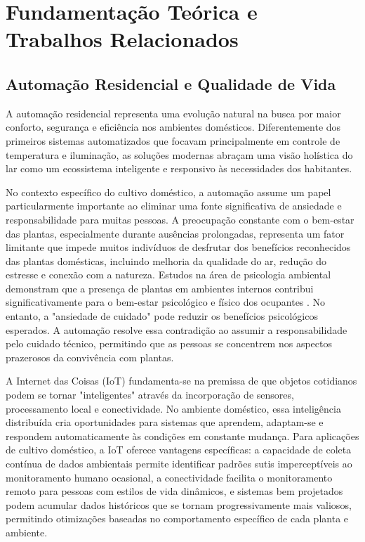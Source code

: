 \documentclass[oneside,english,brazilian]{UNISINOSmonografia}
\begin{document}
\chapter{Fundamentação Teórica e Trabalhos Relacionados}

\section{Automação Residencial e Qualidade de Vida}

A automação residencial representa uma evolução natural na busca por maior conforto, segurança e eficiência nos ambientes domésticos. Diferentemente dos primeiros sistemas automatizados que focavam principalmente em controle de temperatura e iluminação, as soluções modernas abraçam uma visão holística do lar como um ecossistema inteligente e responsivo às necessidades dos habitantes.

No contexto específico do cultivo doméstico, a automação assume um papel particularmente importante ao eliminar uma fonte significativa de ansiedade e responsabilidade para muitas pessoas. A preocupação constante com o bem-estar das plantas, especialmente durante ausências prolongadas, representa um fator limitante que impede muitos indivíduos de desfrutar dos benefícios reconhecidos das plantas domésticas, incluindo melhoria da qualidade do ar, redução do estresse e conexão com a natureza. Estudos na área de psicologia ambiental demonstram que a presença de plantas em ambientes internos contribui significativamente para o bem-estar psicológico e físico dos ocupantes \cite{fbi2025_smart_home_sa}. No entanto, a "ansiedade de cuidado" pode reduzir os benefícios psicológicos esperados. A automação resolve essa contradição ao assumir a responsabilidade pelo cuidado técnico, permitindo que as pessoas se concentrem nos aspectos prazerosos da convivência com plantas.

A Internet das Coisas (IoT) fundamenta-se na premissa de que objetos cotidianos podem se tornar "inteligentes" através da incorporação de sensores, processamento local e conectividade. No ambiente doméstico, essa inteligência distribuída cria oportunidades para sistemas que aprendem, adaptam-se e respondem automaticamente às condições em constante mudança. Para aplicações de cultivo doméstico, a IoT oferece vantagens específicas: a capacidade de coleta contínua de dados ambientais permite identificar padrões sutis imperceptíveis ao monitoramento humano ocasional, a conectividade facilita o monitoramento remoto para pessoas com estilos de vida dinâmicos, e sistemas bem projetados podem acumular dados históricos que se tornam progressivamente mais valiosos, permitindo otimizações baseadas no comportamento específico de cada planta e ambiente.
\end{document}
